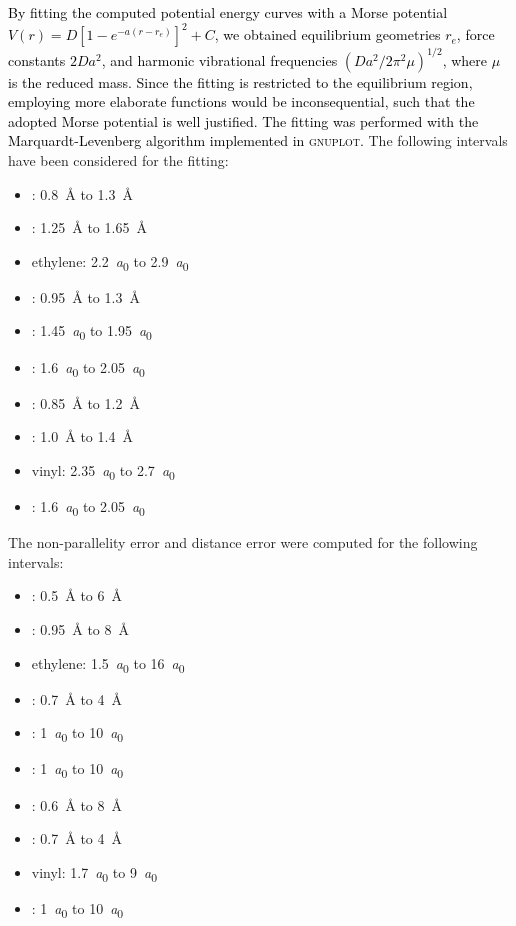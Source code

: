 \documentclass[aip,jcp,preprint,noshowkeys,superscriptaddress]{revtex4-1}
\newcommand{\fk}[1]{\textcolor{black}{#1}}
\begin{document}
\fk{
By fitting the computed potential energy curves with a Morse potential $V(r) = D [1 - e^{-a(r-r_e)}]^2 + C $,
we obtained equilibrium geometries $r_e$, force constants $2Da^2$, and harmonic vibrational frequencies $\left( Da^2/2\pi^2\mu \right)^{1/2}$,
where $\mu$ is the reduced mass.
Since the fitting is restricted to the equilibrium region, employing more elaborate functions would be inconsequential, such that the adopted Morse potential is well justified.
The fitting was performed with the Marquardt-Levenberg algorithm implemented in \textsc{gnuplot}.
}
The following intervals have been considered for the fitting:
\begin{itemize}
\item {}: \SI{0.8}{\angstrom} to \SI{1.3}{\angstrom}
\item {}: \SI{1.25}{\angstrom} to \SI{1.65}{\angstrom}
\item ethylene: \SI{2.2}{\bohr} to \SI{2.9}{\bohr}
\item {}: \SI{0.95}{\angstrom} to \SI{1.3}{\angstrom}
\item {}: \SI{1.45}{\bohr} to \SI{1.95}{\bohr}
\item {}: \SI{1.6}{\bohr} to \SI{2.05}{\bohr}
\item {}: \SI{0.85}{\angstrom} to \SI{1.2}{\angstrom}
\item {}: \SI{1.0}{\angstrom} to \SI{1.4}{\angstrom}
\item vinyl: \SI{2.35}{\bohr} to \SI{2.7}{\bohr}
\item {}: \SI{1.6}{\bohr} to \SI{2.05}{\bohr}
\end{itemize}

\clearpage

The non-parallelity error and distance error were computed for the following intervals:
\begin{itemize}
\item {}: \SI{0.5}{\angstrom} to \SI{6}{\angstrom}
\item {}: \SI{0.95}{\angstrom} to \SI{8}{\angstrom}
\item ethylene: \SI{1.5}{\bohr} to \SI{16}{\bohr}
\item {}: \SI{0.7}{\angstrom} to \SI{4}{\angstrom}
\item {}: \SI{1}{\bohr} to \SI{10}{\bohr}
\item {}: \SI{1}{\bohr} to \SI{10}{\bohr}
\item {}: \SI{0.6}{\angstrom} to \SI{8}{\angstrom}
\item {}: \SI{0.7}{\angstrom} to \SI{4}{\angstrom}
\item vinyl: \SI{1.7}{\bohr} to \SI{9}{\bohr}
\item {}: \SI{1}{\bohr} to \SI{10}{\bohr}
\end{itemize}
\end{document}

